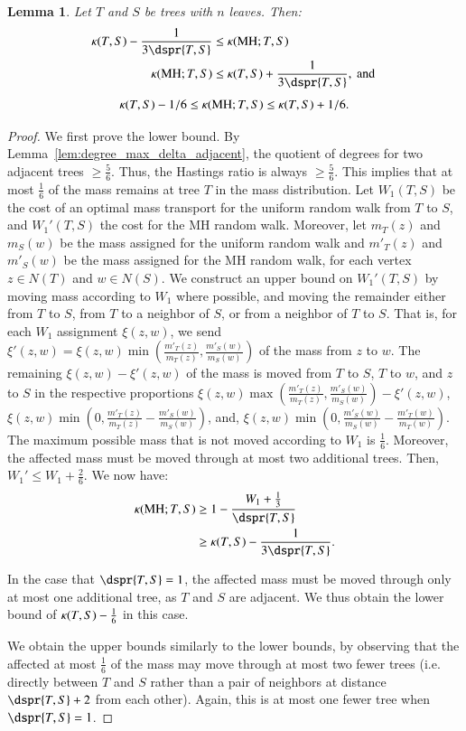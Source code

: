 \documentclass[]{elsarticle}
\newtheorem{lem}[thm]{Lemma}
\newcommand{\MH}{\operatorname{MH}}
\newcommand{\curvature}[2][]{%
    \ifthenelse{\equal{#1}{}}%
		{\kappa(#2)}%
		{\kappa_{#1}(#2)}%
}
\begin{document}
\begin{lem}
	\label{lem:mh_curvature}
	Let $T$ and $S$ be trees with $n$ leaves. Then:
	\begin{align*}
	\curvature{T,S} - \frac{1}{3\dspr{T,S}}
	&\le \curvature{\MH; T,S} \\
	\curvature{\MH; T,S}
	&\le \curvature{T,S} + \frac{1}{3\dspr{T,S}},\text{ and }
\end{align*}
	$$\curvature{T,S} - 1/6
	\le \curvature{\MH; T,S}
	\le \curvature{T,S} + 1/6 .$$ 
\end{lem}
\begin{proof}
	We first prove the lower bound.
	By Lemma~\ref{lem:degree_max_delta_adjacent}, the quotient of degrees for two adjacent trees $\ge \frac{5}{6}$.
	Thus, the Hastings ratio is always $\ge \frac{5}{6}$.
	This implies that at most $\frac{1}{6}$ of the mass remains at tree $T$ in the mass distribution.
	Let $W_1(T,S)$ be the cost of an optimal mass transport for the uniform random walk from $T$ to $S$, and $W_1'(T,S)$ the cost for the MH random walk.
	Moreover, let $m_T(z)$ and $m_S(w)$ be the mass assigned for the uniform random walk and $m'_T(z)$ and $m'_S(w)$ be the mass assigned for the MH random walk, for each vertex $z \in N(T)$ and $w \in N(S)$.
	We construct an upper bound on $W_1'(T,S)$ by moving mass according to $W_1$ where possible, and moving the remainder either from $T$ to $S$, from $T$ to a neighbor of $S$, or from a neighbor of $T$ to $S$.
	That is, for each $W_1$ assignment $\xi(z,w)$, we send $\xi'(z,w) = \xi(z,w) \min\left(\frac{m'_T(z)}{m_T(z)}, \frac{m'_S(w)}{m_S(w)}\right)$ of the mass from $z$ to $w$.
	The remaining $\xi(z,w) - \xi'(z,w)$ of the mass is moved from $T$ to $S$, $T$ to $w$, and $z$ to $S$ in the respective proportions
	$\xi(z,w) \max\left(\frac{m'_T(z)}{m_T(z)}, \frac{m'_S(w)}{m_S(w)}\right) - \xi'(z,w)$,
	$\xi(z,w) \min\left(0, \frac{m'_T(z)}{m_T(z)} - \frac{m'_S(w)}{m_S(w)}\right)$, and,
	$\xi(z,w) \min\left(0, \frac{m'_S(w)}{m_S(w)} - \frac{m'_T(w)}{m_T(w)}\right)$.
	The maximum possible mass that is not moved according to $W_1$ is $\frac{1}{6}$.
	Moreover, the affected mass must be moved through at most two additional trees.
	Then, $W_1' \le W_1 + \frac{2}{6}$.
	We now have:
	\begin{align*}
		\curvature{\MH; T,S} & \ge 1 - \frac{W_1 + \frac{1}{3}}{\dspr{T,S}} \\
		& \ge \curvature{T,S} - \frac{1}{3\dspr{T,S}}.
	\end{align*}

	In the case that $\dspr{T,S}=1$, the affected mass must be moved through only at most one additional tree, as $T$ and $S$ are adjacent.
	We thus obtain the lower bound of $\curvature{T,S} - \frac{1}{6}$ in this case.

	We obtain the upper bounds similarly to the lower bounds, by observing that the affected at most $\frac{1}{6}$ of the mass may move through at most two fewer trees (i.e. directly between $T$ and $S$ rather than a pair of neighbors at distance $\dspr{T,S} + 2$ from each other).
	Again, this is at most one fewer tree when $\dspr{T,S}=1$.
\end{proof}
\end{document}
